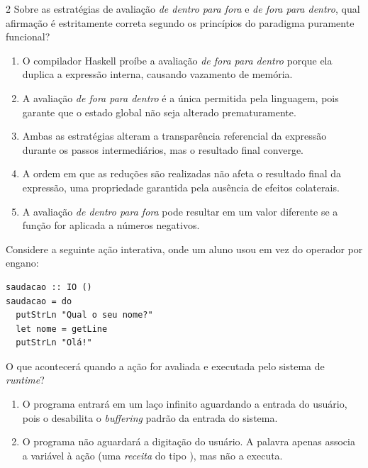 \documentclass[a4paper,10pt,brazil]{article}
\begin{document}
\begin{multicols}{2}
Sobre as estratégias de avaliação \emph{de dentro para fora} e \emph{de fora para dentro}, qual afirmação é estritamente correta segundo os princípios do paradigma puramente funcional?

\begin{enumerate}
  \item O compilador Haskell proíbe a avaliação \emph{de fora para dentro} porque ela duplica a expressão interna, causando vazamento de memória.

  \item A avaliação \emph{de fora para dentro} é a única permitida pela linguagem, pois garante que o estado global não seja alterado prematuramente.

  \item Ambas as estratégias alteram a transparência referencial da expressão durante os passos intermediários, mas o resultado final converge.

  \item A ordem em que as reduções são realizadas não afeta o resultado final da expressão, uma propriedade garantida pela ausência de efeitos colaterais.

  \item A avaliação \emph{de dentro para fora} pode resultar em um valor diferente se a função  for aplicada a números negativos.


\end{enumerate}

Considere a seguinte ação interativa, onde um aluno usou  em vez do operador \haskellinline{<-} por engano:

\begin{verbatim}
saudacao :: IO ()
saudacao = do
  putStrLn "Qual o seu nome?"
  let nome = getLine
  putStrLn "Olá!"
\end{verbatim}

O que acontecerá quando a ação  for avaliada e executada pelo sistema de \emph{runtime}?

\begin{enumerate}
  \item O programa entrará em um laço infinito aguardando a entrada do usuário, pois o  desabilita o \emph{buffering} padrão da entrada do sistema.

  \item O programa não aguardará a digitação do usuário. A palavra  apenas associa a variável  à ação (uma \emph{receita} do tipo ), mas não a executa.


\end{enumerate}
\end{multicols}
\end{document}
